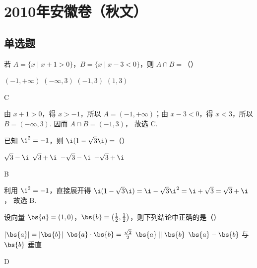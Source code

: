 \chapter{2010年安徽卷（秋文）}

\section{单选题}

\begin{problem}
若 \(A = \{x \mid x + 1 > 0\}\)，\(B = \{x \mid x - 3 < 0\}\)，则 \(A \cap B =\)（\quad）

\choices
    {\((-1, +\infty)\)}
    {\((- \infty, 3)\)}
    {\((-1,3)\)}
    {\((1,3)\)}
\end{problem}

\begin{answer}
C
\end{answer}

\begin{solution}
由 \(x+1>0\)，得 \(x>-1\)，所以 \(A=(-1,+\infty)\)；由 \(x-3<0\)，得 \(x<3\)，所以 \(B=(-\infty,3)\). 因而
\(A\cap B=(-1,3)\)，
故选 C.
\end{solution}

\begin{problem}
已知 \( \i^2 = -1 \)，则 \( \i(1 - \sqrt{3}\i) = \)（\quad）

\choices
    {\(\sqrt{3} - \i\)}
    {\(\sqrt{3} + \i\)}
    {\(-\sqrt{3} - \i\)}
    {\(-\sqrt{3} + \i\)}
\end{problem}

\begin{answer}
B
\end{answer}

\begin{solution}
利用 \(\i^2=-1\)，直接展开得
\(\i(1-\sqrt3\i)=\i-\sqrt3\i^2=\i+\sqrt3=\sqrt3+\i\)，
故选 B.
\end{solution}

\begin{problem}
设向量 \( \bs{a}=(1,0) \)，\( \bs{b}=\left(\frac{1}{2},\frac{1}{2}\right) \)，则下列结论中正确的是（\quad）

\choices
    {\(|\bs{a}| = |\bs{b}|\)}
    {\(\bs{a}\cdot \bs{b} = \frac{\sqrt{2}}{2}\)}
    {\(\bs{a} \parallel \bs{b}\)}
    {\(\bs{a} - \bs{b}\) 与 \(\bs{b}\) 垂直}
\end{problem}

\begin{answer}
D
\end{answer}

